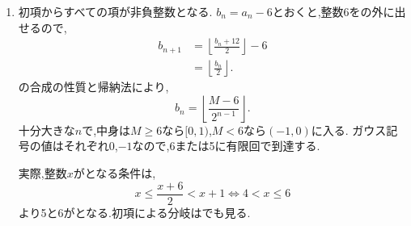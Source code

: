 \noindent {}\par\nobreak
\begin{enumerate}[label=(\arabic*),parsep=3pt,beginpenalty=10000,format=\bookitemlink{example-gauss-role-6}{solution}{problem}]
  \item 初項からすべての項が非負整数となる.
    $b_n=a_n-6$とおくと,整数6をの外に出せるので,
    \begin{align*}
      b_{n+1}
      &=\left\lfloor\frac{b_n+12}{2}\right\rfloor-6\\
      &=\left\lfloor\frac{b_n}{2}\right\rfloor.
    \end{align*}
    の合成の性質と帰納法により,
    \[
      b_n=\left\lfloor\frac{M-6}{2^{n-1}}\right\rfloor.
    \]
    十分大きな$n$で,中身は$M\ge6$なら$[0,1)$,$M<6$なら$(-1,0)$に入る.
    ガウス記号の値はそれぞれ0,$-1$なので,6または5に有限回で到達する.

    実際,整数$x$がとなる条件は,
    \[
      x\le\frac{x+6}{2}<x+1
      \iff 4<x\le6
    \]
    より5と6がとなる.初項による分岐はでも見る.
\end{enumerate}

